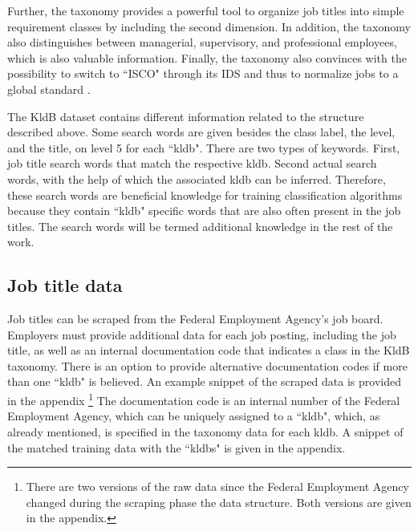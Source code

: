 \documentclass[12pt, a4paper, titlepage]{article}
\begin{document}
Further, the taxonomy provides a powerful tool to organize job titles into simple requirement classes by including the second dimension. In addition, the taxonomy also distinguishes between managerial, supervisory, and professional employees, which is also valuable information. Finally, the taxonomy also convinces with the possibility to switch to ``\ac{ISCO}" through its IDS and thus to normalize jobs to a global standard \citep{Bundesagentur2011b}. 
  
The \ac{KldB} dataset contains different information related to the structure described above. Some search words are given besides the class label, the level, and the title, on level 5 for each ``kldb". There are two types of keywords. First, job title search words that match the respective kldb. Second actual search words, with the help of which the associated kldb can be inferred. Therefore, these search words are beneficial knowledge for training classification algorithms because they contain ``kldb" specific words that are also often present in the job titles. The search words will be termed additional knowledge in the rest of the work. 
 
\subsection{Job title data}
Job titles can be scraped from the Federal Employment Agency's job board. Employers must provide additional data for each job posting, including the job title, as well as an internal documentation code that indicates a class in the \ac{KldB} taxonomy. There is an option to provide alternative documentation codes if more than one ``kldb" is believed. An example snippet of the scraped data is provided in the appendix \footnote{There are two versions of the raw data since the Federal Employment Agency changed during the scraping phase the data structure. Both versions are given in the appendix.} The documentation code is an internal number of the Federal Employment Agency, which can be uniquely assigned to a ``kldb", which, as already mentioned, is specified in the taxonomy data for each kldb. A snippet of the matched training data with the ``kldbs" is given in the appendix.
\end{document}

